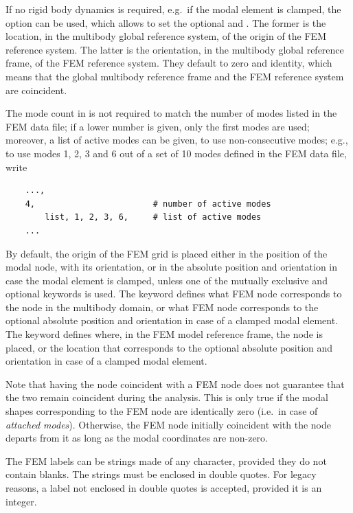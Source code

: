 If no rigid body dynamics is required, e.g.\ if the modal element
is clamped, the  option can be used, which allows
to set the optional 
and .
The former is the location, in the multibody
global reference system, of the origin of the FEM reference system.
The latter is the orientation,
in the multibody global reference frame,
of the FEM reference system.
They default to zero and identity, which means
that the global multibody reference frame
and the FEM reference system are coincident.

The mode count in  is not required to match
the number of modes listed in the FEM data file; if a lower number
is given, only the first  modes are used;
moreover, a list of active modes can be given, to use non-consecutive
modes; e.g., to use modes 1, 2, 3 and 6 out of a set of 10 modes
defined in the FEM data file, write
\begin{verbatim}
    ...,
    4,                        # number of active modes
        list, 1, 2, 3, 6,     # list of active modes
    ...
\end{verbatim}

By default, the origin of the FEM grid is placed either in the position
of the modal node, with its orientation, or in the absolute position 
and orientation in case the modal element is clamped, 
unless one of the mutually exclusive  
and  optional keywords is used.
The  keyword defines what FEM node corresponds 
to the  node in the multibody domain,
or what FEM node corresponds to the optional absolute position 
and orientation in case of a clamped modal element.
The  keyword defines where, in the FEM model
reference frame, the  node is placed, or the location
that corresponds to the optional absolute position and orientation
in case of a clamped modal element.

Note that having the  node coincident with a FEM node
does not guarantee that the two remain coincident during the analysis.
This is only true if the modal shapes corresponding to the FEM node
are identically zero (i.e.\ in case of \emph{attached modes}).
Otherwise, the FEM node initially coincident with the  node
departs from it as long as the modal coordinates are non-zero.

The FEM labels can be strings made of any character,
provided they do not contain blanks.
The strings must be enclosed in double quotes.
For legacy reasons, a label not enclosed in double quotes
is accepted, provided it is an integer.

